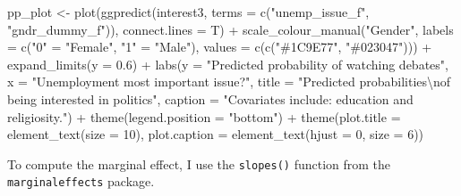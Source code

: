 \documentclass[
]{article}
\newenvironment{Shaded}{\begin{snugshade}}{\end{snugshade}}
\newcommand{\AttributeTok}[1]{\textcolor[rgb]{0.77,0.63,0.00}{#1}}
\newcommand{\DecValTok}[1]{\textcolor[rgb]{0.00,0.00,0.81}{#1}}
\newcommand{\FloatTok}[1]{\textcolor[rgb]{0.00,0.00,0.81}{#1}}
\newcommand{\FunctionTok}[1]{\textcolor[rgb]{0.00,0.00,0.00}{#1}}
\newcommand{\NormalTok}[1]{#1}
\newcommand{\OtherTok}[1]{\textcolor[rgb]{0.56,0.35,0.01}{#1}}
\newcommand{\SpecialCharTok}[1]{\textcolor[rgb]{0.00,0.00,0.00}{#1}}
\newcommand{\StringTok}[1]{\textcolor[rgb]{0.31,0.60,0.02}{#1}}
\begin{document}
\begin{Shaded}
\begin{Highlighting}[]
\NormalTok{pp\_plot }\OtherTok{\textless{}{-}} \FunctionTok{plot}\NormalTok{(}\FunctionTok{ggpredict}\NormalTok{(interest3, }\AttributeTok{terms =} \FunctionTok{c}\NormalTok{(}\StringTok{"unemp\_issue\_f"}\NormalTok{, }\StringTok{"gndr\_dummy\_f"}\NormalTok{)), }
     \AttributeTok{connect.lines =}\NormalTok{ T) }\SpecialCharTok{+}
  \FunctionTok{scale\_colour\_manual}\NormalTok{(}\StringTok{"Gender"}\NormalTok{,}
                      \AttributeTok{labels =} \FunctionTok{c}\NormalTok{(}\StringTok{"0"} \OtherTok{=} \StringTok{"Female"}\NormalTok{,}
                                 \StringTok{"1"} \OtherTok{=} \StringTok{"Male"}\NormalTok{),}
                      \AttributeTok{values =} \FunctionTok{c}\NormalTok{(}\FunctionTok{c}\NormalTok{(}\StringTok{"\#1C9E77"}\NormalTok{, }\StringTok{"\#023047"}\NormalTok{))) }\SpecialCharTok{+}
  \FunctionTok{expand\_limits}\NormalTok{(}\AttributeTok{y =} \FloatTok{0.6}\NormalTok{) }\SpecialCharTok{+}
  \FunctionTok{labs}\NormalTok{(}\AttributeTok{y =} \StringTok{"Predicted probability of watching debates"}\NormalTok{,}
       \AttributeTok{x =} \StringTok{"Unemployment most important issue?"}\NormalTok{,}
       \AttributeTok{title =} \StringTok{"Predicted probabilities}\SpecialCharTok{\textbackslash{}n}\StringTok{of being interested in politics"}\NormalTok{, }
       \AttributeTok{caption =} \StringTok{"Covariates include: education and religiosity."}\NormalTok{) }\SpecialCharTok{+}
  \FunctionTok{theme}\NormalTok{(}\AttributeTok{legend.position =} \StringTok{"bottom"}\NormalTok{) }\SpecialCharTok{+}
  \FunctionTok{theme}\NormalTok{(}\AttributeTok{plot.title =} \FunctionTok{element\_text}\NormalTok{(}\AttributeTok{size =} \DecValTok{10}\NormalTok{),}
        \AttributeTok{plot.caption =} \FunctionTok{element\_text}\NormalTok{(}\AttributeTok{hjust =} \DecValTok{0}\NormalTok{, }\AttributeTok{size =} \DecValTok{6}\NormalTok{))}
\end{Highlighting}
\end{Shaded}

To compute the marginal effect, I use the \texttt{slopes()} function
from the \texttt{marginaleffects} package.
\end{document}

